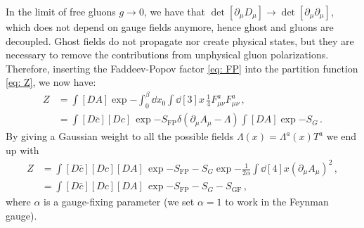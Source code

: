 \documentclass{article}
\begin{document}
In the limit of free gluons $g \to 0$, we have that $\det \left[ \partial_\mu D_\mu \right] \to \det \left[ \partial_\mu \partial_\mu \right]$, which does not depend on gauge fields anymore, hence ghost and gluons are decoupled. Ghost fields do not propagate nor create physical states, but they are necessary to remove the contributions from unphysical gluon polarizations. Therefore, inserting the Faddeev-Popov factor \eqref{eq: FP} into the partition function \eqref{eq: Z}, we now have:
\begin{align*}
    Z &= \int \left[ DA \right] \exp{- \int_0^\beta \dd{x_0} \int \dd[3]{x} \, \frac{1}{4} F_{\mu\nu}^a F_{\mu\nu}^a} \, , \\
     &= \int [D\bar{c}] [Dc] \, \exp{-S_{\textrm{FP}}} \delta(\partial_\mu A_\mu - \Lambda) \int \left[ DA \right] \exp{- S_G} \, .
\end{align*}
By giving a Gaussian weight to all the possible fields $\Lambda(x) = \Lambda^a(x) T^a$ we end up with
\begin{align*}
        Z &= \int [D\bar{c}] [Dc] \left[ DA \right] \, \exp{-S_{\textrm{FP}} - S_G} \exp{- \frac{1}{2\alpha} \int \dd[4]{x} (\partial_\mu A_\mu)^2} \, , \\
          &= \int [D\bar{c}] [Dc] \left[ DA \right] \, \exp{-S_{\textrm{FP}} - S_G -S_{\textrm{GF}}} \, ,
\end{align*}
where $\alpha$ is a gauge-fixing parameter (we set $\alpha = 1$ to work in the Feynman gauge).
\end{document}
